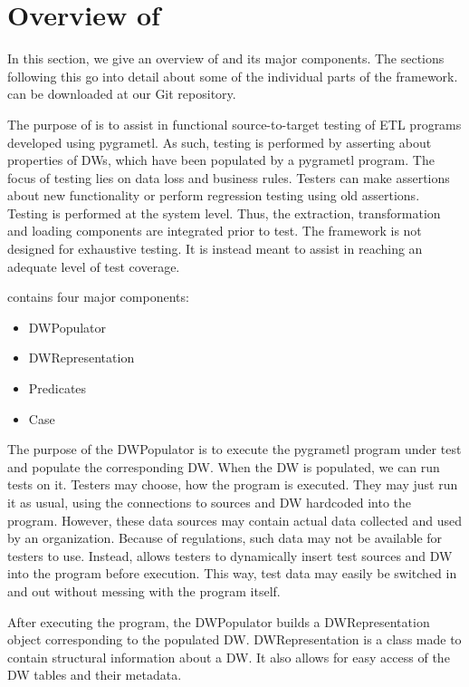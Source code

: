 \section{Overview of \FW{}}\label{sect:Overview}
In this section, we give an overview of \FW{} and its major components. The sections following this go into detail about some of the individual parts of the framework. \FW{} can be downloaded at our Git repository\cite{SkiRaffGit}.

The purpose of \FW{} is to assist in functional source-to-target testing of ETL programs developed using pygrametl. As such, testing is performed by asserting about properties of DWs, which have been populated by a pygrametl program. The focus of testing lies on data loss and business rules. Testers can make assertions about new functionality or perform regression testing using old assertions. Testing is performed at the system level. Thus, the extraction, transformation and loading components are integrated prior to test. The framework is not designed for exhaustive testing. It is instead meant to assist in reaching an adequate level of test coverage.

\FW{} contains four major components:
\begin{itemize}
\item DWPopulator
\item DWRepresentation
\item Predicates
\item Case 
\end{itemize}

The purpose of the DWPopulator is to execute the pygrametl program under test and populate the corresponding DW. When the DW is populated, we can run tests on it.  Testers may choose, how the program is executed. They may just run it as usual, using the connections to sources and DW hardcoded into the program. However, these data sources may contain actual data collected and used by an organization. Because of regulations, such data may not be available for testers to use. Instead, \FW{} allows testers to dynamically insert test sources and DW into the program before execution. This way, test data may easily be switched in and out without messing with the program itself.  

After executing the program, the DWPopulator builds a DWRepresentation object corresponding to the populated DW. DWRepresentation is a class made to contain structural information about a DW. It also allows for easy access of the DW tables and their metadata.

